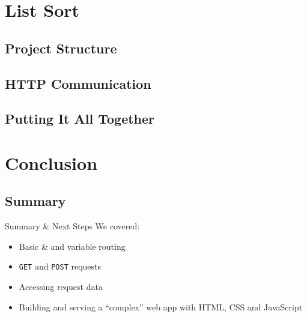 \documentclass{beamer}
\begin{document}
\section{List Sort}

\subsection{Project Structure}

\subsection{HTTP Communication}

\subsection{Putting It All Together}


\section{Conclusion}

\subsection{Summary}
	\begin{frame}[t]{Summary \& Next Steps}
		We covered:
		\begin{itemize}
			\item{Basic \& and variable routing}
			\item{\texttt{GET} and \texttt{POST} requests}
			\item{Accessing request data}
			\item{Building and serving a ``complex'' web app with HTML, CSS and
					JavaScript}
		\end{itemize}
	\end{frame}
\end{document}
